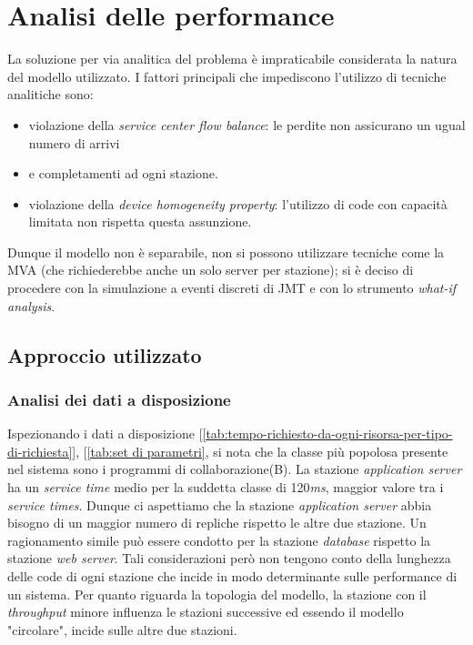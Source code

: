 \documentclass[../main.tex]{subfiles}
\begin{document}
    \chapter{Analisi delle performance}\label{ch:analisi-delle-performance}

    La soluzione per via analitica del problema è impraticabile considerata la natura del
    modello utilizzato. I fattori principali che impediscono l’utilizzo di tecniche analitiche
    sono:
    \begin{itemize}
        \item violazione della \textit{service center flow balance}: le perdite non assicurano un ugual numero di arrivi
        \item e completamenti ad ogni stazione.
        \item violazione della \textit{device homogeneity property}: l'utilizzo di code con capacità limitata non
        rispetta questa assunzione.
    \end{itemize}
    Dunque il modello non è separabile, non si possono utilizzare tecniche come la MVA (che
    richiederebbe anche un solo server per stazione); si è deciso di procedere
    con la simulazione a eventi discreti di JMT e con lo strumento \textit{what-if analysis}.


    \section{Approccio utilizzato}\label{sec:approccio-utilizzato}

    \subsection{Analisi dei dati a disposizione}\label{subsec:analisi-dei-dati-a-disposizione}
    Ispezionando i dati a disposizione [\ref{tab:tempo-richiesto-da-ogni-risorsa-per-tipo-di-richiesta}],
    [\ref{tab:set di parametri}, si nota che la classe più popolosa presente nel sistema sono i programmi di
    collaborazione(B). La stazione \textit{application server} ha un \textit{service time} medio per la suddetta classe
    di 120\textit{ms}, maggior valore tra i \textit{service times}.
    Dunque ci aspettiamo che la stazione \textit{application server} abbia bisogno di un maggior numero di repliche
    rispetto le altre due stazione.
    Un ragionamento simile può essere condotto per la stazione \textit{database} rispetto la stazione
    \textit{web server}.
    Tali considerazioni però non tengono conto della lunghezza delle code di ogni stazione che incide in modo
    determinante sulle performance di un sistema.
    Per quanto riguarda la topologia del modello, la stazione con il \textit{throughput} minore influenza le
    stazioni successive ed essendo il modello "circolare", incide sulle altre due stazioni.
\end{document}
